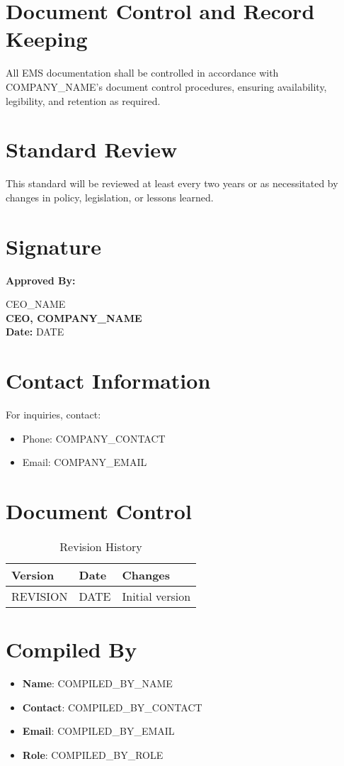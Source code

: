 \documentclass[12pt]{article}
\begin{document}
\section{Document Control and Record Keeping}
All EMS documentation shall be controlled in accordance with {{COMPANY_NAME}}'s document control procedures, ensuring availability, legibility, and retention as required.

\section{Standard Review}
This standard will be reviewed at least every two years or as necessitated by changes in policy, legislation, or lessons learned.

\section{Signature}
\textbf{Approved By:}

{{CEO_NAME}}\\
\textbf{CEO, {{COMPANY_NAME}}}\\
\textbf{Date:} {{DATE}}

\section{Contact Information}
For inquiries, contact:
\begin{itemize}
    \item Phone: {{COMPANY_CONTACT}}
    \item Email: {{COMPANY_EMAIL}}
\end{itemize}

\section{Document Control}
\begin{table}[h]
    \centering
    \begin{tabular}{p{3cm}p{3cm}p{6cm}}
        \toprule
        \textbf{Version} & \textbf{Date} & \textbf{Changes} \\
        \midrule
        {{REVISION}} & {{DATE}} & Initial version \\
        \bottomrule
    \end{tabular}
    \caption{Revision History}
\end{table}

\section{Compiled By}
\begin{itemize}
    \item \textbf{Name}: {{COMPILED_BY_NAME}}
    \item \textbf{Contact}: {{COMPILED_BY_CONTACT}}
    \item \textbf{Email}: {{COMPILED_BY_EMAIL}}
    \item \textbf{Role}: {{COMPILED_BY_ROLE}}
\end{itemize}
\end{document}

